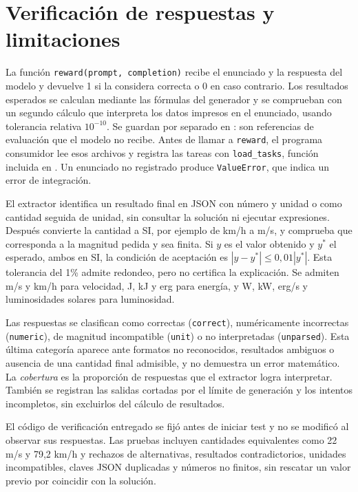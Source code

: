 \section{Verificación de respuestas y limitaciones}
La función \texttt{reward(prompt, completion)} recibe el enunciado y la respuesta
del modelo y devuelve 1 si la considera correcta o 0 en caso contrario. Los
resultados esperados se calculan mediante las fórmulas del generador y se
comprueban con un segundo cálculo que interpreta los datos impresos en el
enunciado, usando tolerancia relativa $10^{-10}$. Se guardan por separado en
: son referencias de evaluación que el modelo no
recibe. Antes de llamar a \texttt{reward}, el programa
consumidor lee esos archivos y registra las tareas con \texttt{load\_tasks},
función incluida en . Un enunciado no
registrado produce \texttt{ValueError}, que indica un error de integración.

El extractor identifica un resultado final en JSON con número y unidad o como
cantidad seguida de unidad, sin consultar la solución ni ejecutar expresiones.
Después convierte la cantidad a SI, por ejemplo de km/h a m/s, y comprueba
que corresponda a la magnitud pedida y sea finita. Si $y$ es el valor obtenido
y $y^*$ el esperado, ambos en SI, la condición de aceptación es
$|y-y^*|\leq0{,}01|y^*|$. Esta tolerancia del 1\% admite redondeo, pero no
certifica la explicación. Se admiten m/s y km/h para velocidad, J, kJ y erg
para energía, y W, kW, erg/s y luminosidades solares para luminosidad.

Las respuestas se clasifican como correctas (\texttt{correct}), numéricamente
incorrectas (\texttt{numeric}), de magnitud incompatible (\texttt{unit}) o no
interpretadas (\texttt{unparsed}). Esta última categoría aparece ante formatos
no reconocidos, resultados ambiguos o ausencia de una cantidad final admisible,
y no demuestra un error matemático. La \emph{cobertura} es la proporción de
respuestas que el extractor logra interpretar. También se registran las salidas
cortadas por el límite de generación y los intentos incompletos, sin excluirlos
del cálculo de resultados.

El código de verificación entregado se fijó antes de iniciar test y no se
modificó al observar sus respuestas. Las pruebas incluyen
cantidades equivalentes como 22 m/s y 79,2 km/h y rechazos de alternativas,
resultados contradictorios, unidades incompatibles, claves JSON duplicadas y
números no finitos, sin rescatar un valor previo por coincidir con la solución.

